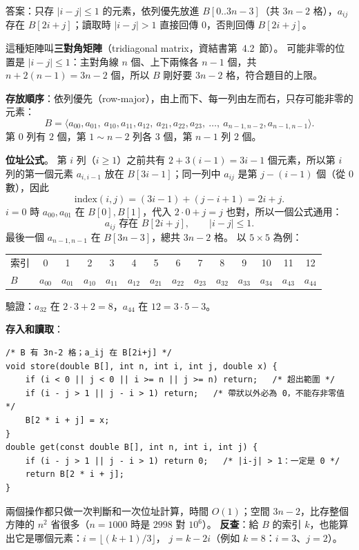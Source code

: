 \begin{pastsoln}
答案：只存 $|i - j| \le 1$ 的元素，依列優先放進 $B[0..3n-3]$（共 $3n - 2$ 格），$a_{ij}$ 存在
$B[2i + j]$；讀取時 $|i - j| > 1$ 直接回傳 $0$，否則回傳 $B[2i + j]$。

這種矩陣叫\textbf{三對角矩陣}（tridiagonal matrix，資結書第~4.2~節）。 可能非零的位置是 $|i - j| \le 1$：主對角線
$n$ 個、上下兩條各 $n - 1$ 個，共 $n + 2(n - 1) = 3n - 2$ 個，所以 $B$ 剛好要 $3n - 2$ 格，符合題目的上限。

\textbf{存放順序}：依列優先（row-major），由上而下、每一列由左而右，只存可能非零的元素：
\[
B = \langle a_{00}, a_{01},\ a_{10}, a_{11}, a_{12},\ a_{21}, a_{22}, a_{23},\ \ldots,\ a_{n-1,n-2}, a_{n-1,n-1} \rangle .
\]
第 $0$ 列有 $2$ 個，第 $1 \sim n-2$ 列各 $3$ 個，第 $n - 1$ 列 $2$ 個。

\textbf{位址公式}。 第 $i$ 列（$i \ge 1$）之前共有 $2 + 3(i - 1) = 3i - 1$ 個元素，所以第 $i$ 列的第一個元素
$a_{i,i-1}$ 放在 $B[3i - 1]$；同一列中 $a_{ij}$ 是第 $j - (i - 1)$ 個（從 $0$ 數），因此
\[
\text{index}(i, j) = (3i - 1) + (j - i + 1) = 2i + j .
\]
$i = 0$ 時 $a_{00}, a_{01}$ 在 $B[0], B[1]$，代入 $2 \cdot 0 + j = j$ 也對，所以一個公式通用：
\[
a_{ij} \text{ 存在 } B[2i + j], \qquad |i - j| \le 1 .
\]
最後一個 $a_{n-1,n-1}$ 在 $B[3n - 3]$，總共 $3n - 2$ 格。 以 $5 \times 5$ 為例：
\begin{center}
\small
\setlength{\tabcolsep}{3.5pt}
\begin{tabular}{l*{13}{|c}|}
索引 & 0 & 1 & 2 & 3 & 4 & 5 & 6 & 7 & 8 & 9 & 10 & 11 & 12 \\ 
$B$ & $a_{00}$ & $a_{01}$ & $a_{10}$ & $a_{11}$ & $a_{12}$ & $a_{21}$ & $a_{22}$ & $a_{23}$ & $a_{32}$ & $a_{33}$ & $a_{34}$ & $a_{43}$ & $a_{44}$ \\ 
\end{tabular}
\end{center}
驗證：$a_{32}$ 在 $2 \cdot 3 + 2 = 8$，$a_{44}$ 在 $12 = 3 \cdot 5 - 3$。

\textbf{存入和讀取}：
\begin{verbatim}
/* B 有 3n-2 格；a_ij 在 B[2i+j] */
void store(double B[], int n, int i, int j, double x) {
    if (i < 0 || j < 0 || i >= n || j >= n) return;   /* 超出範圍 */
    if (i - j > 1 || j - i > 1) return;   /* 帶狀以外必為 0，不能存非零值 */
    B[2 * i + j] = x;
}
double get(const double B[], int n, int i, int j) {
    if (i - j > 1 || j - i > 1) return 0;   /* |i-j| > 1：一定是 0 */
    return B[2 * i + j];
}
\end{verbatim}
兩個操作都只做一次判斷和一次位址計算，時間 $O(1)$；空間 $3n - 2$，比存整個方陣的 $n^2$ 省很多（$n = 1000$ 時是
$2998$ 對 $10^6$）。 \textbf{反查}：給 $B$ 的索引 $k$，也能算出它是哪個元素：$i = \lfloor (k + 1)/3 \rfloor$，
$j = k - 2i$（例如 $k = 8$：$i = 3$、$j = 2$）。
\end{pastsoln}
